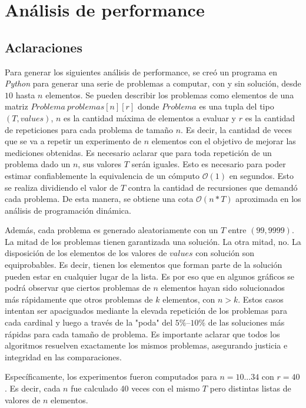 \section{Análisis de performance}
\subsection{Aclaraciones}
Para generar los siguientes análisis de performance, se creó un programa en \textit{Python} para generar una serie de problemas a computar, con y sin solución, desde $10$ hasta $n$ elementos. Se pueden describir los problemas como elementos de una matriz $Problema \ problemas[n][r]$ donde $Problema$ es una tupla del tipo $(T, values)$, $n$ es la cantidad máxima de elementos a evaluar y $r$ es la cantidad de repeticiones para cada problema de tamaño $n$. Es decir, la cantidad de veces que se va a repetir un experimento de $n$ elementos con el objetivo de mejorar las mediciones obtenidas. Es necesario aclarar que para toda repetición de un problema dado un $n$, sus valores $T$ serán iguales. Esto es necesario para poder estimar confiablemente la equivalencia de un cómputo $\mathcal{O}(1)$ en segundos. Esto se realiza dividiendo el valor de $T$ contra la cantidad de recursiones que demandó cada problema. De esta manera, se obtiene una cota $\mathcal{O}(n*T)$ aproximada en los análisis de programación dinámica.

\vskip 8pt

Además, cada problema es generado aleatoriamente con un $T$ entre $(99, 9999)$. La mitad de los problemas tienen garantizada una solución. La otra mitad, no. La disposición de los elementos de los valores de $values$ con solución son equiprobables. Es decir, tienen los elementos que forman parte de la solución pueden estar en cualquier lugar de la lista. Es por eso que en algunos gráficos se podrá observar que ciertos problemas de $n$ elementos hayan sido solucionados más rápidamente que otros problemas de $k$ elementos, con $n > k$. Estos casos intentan ser apaciguados mediante la elevada repetición de los problemas para cada cardinal y luego a través de la "poda" del $5\%–10\%$ de las soluciones más rápidas para cada tamaño de problema. Es importante aclarar que todos los algoritmos resuelven exactamente los mismos problemas, asegurando justicia e integridad en las comparaciones.

\vskip 8pt

Específicamente, los experimentos fueron computados para $n = 10 ... 34$ con $r = 40$. Es decir, cada $n$ fue calculado 40 veces con el mismo $T$ pero distintas listas de valores de $n$ elementos.

